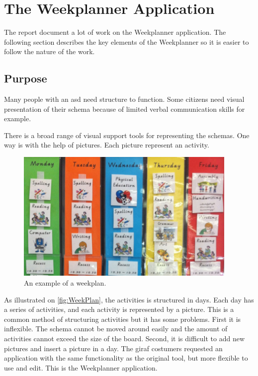 \section{The Weekplanner Application}\label{sec:TheWeekplannerApplication}

The report document a lot of work on the Weekplanner application. The following section describes the key elements of the Weekplanner so it is easier to follow the nature of the work.

\subsection{Purpose}
Many people with an \gls{asd} need structure to function. Some \glspl{citizen} need visual presentation\cite{VisualSupport} of their schema because of limited verbal communication skills for example. 

There is a broad range of visual support tools for representing the schemas. One way is with the help of pictures. Each picture represent an activity.

\begin{figure}[H]
    \begin{center}
        \includegraphics[width=0.95\textwidth]{figures/WeekPlanEks.png}
    \end{center}
    \caption{An example of a weekplan.\cite{VisualSupport}}
    \label{fig:WeekPlan}
\end{figure}

As illustrated on \autoref{fig:WeekPlan}, the activities is structured in days. Each day has a series of activities, and each activity is represented by a picture.
This is a common method of structuring activities but it has some problems. First it is inflexible. The schema cannot be moved around easily and the amount of activities cannot exceed the size of the board. Second, it is difficult to add new pictures and insert a picture in a day. 
The \gls{giraf} costumers requested an application with the same functionality as the original tool, but more flexible to use and edit. This is the Weekplanner application. 

